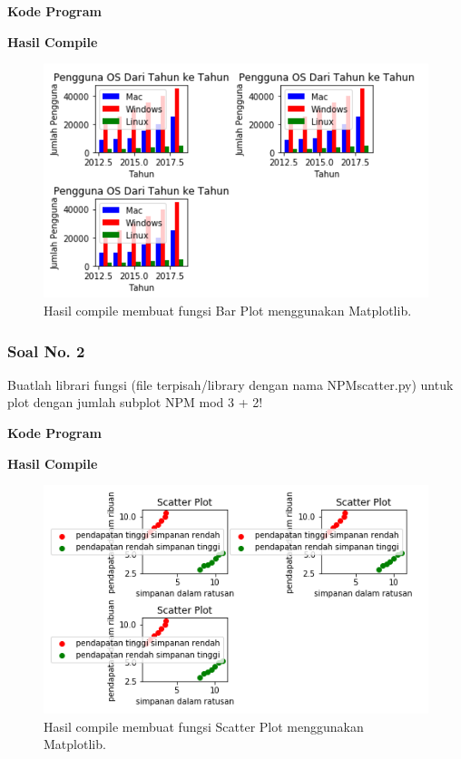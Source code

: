 \hfill \break
\textbf{Kode Program}



\hfill \break
\textbf{Hasil Compile}

\begin{figure}[H]
	\includegraphics[width=12cm]{figures/6/1174042/p1.png}
	\centering
	\caption{Hasil compile membuat fungsi Bar Plot menggunakan Matplotlib.}
\end{figure}

\subsubsection{Soal No. 2}
\hfill \break
Buatlah librari fungsi (file terpisah/library dengan nama NPMscatter.py) untuk plot dengan jumlah subplot NPM mod 3 + 2!

\hfill \break
\textbf{Kode Program}



\hfill \break
\textbf{Hasil Compile}

\begin{figure}[H]
	\includegraphics[width=12cm]{figures/6/1174042/p2.png}
	\centering
	\caption{Hasil compile membuat fungsi Scatter Plot menggunakan Matplotlib.}
\end{figure}

